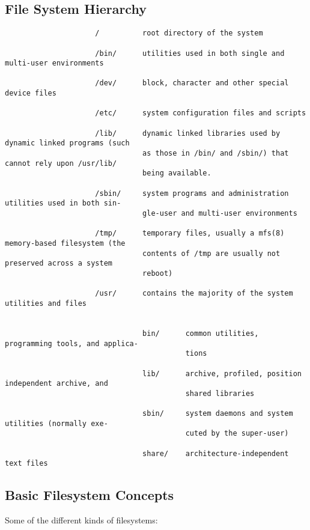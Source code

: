 \documentclass[xga]{xdvislides}
\begin{document}
\subsection{File System Hierarchy}
\small
\begin{verbatim}
                     /          root directory of the system

                     /bin/      utilities used in both single and multi-user environments

                     /dev/      block, character and other special device files

                     /etc/      system configuration files and scripts

                     /lib/      dynamic linked libraries used by dynamic linked programs (such
                                as those in /bin/ and /sbin/) that cannot rely upon /usr/lib/
                                being available.

                     /sbin/     system programs and administration utilities used in both sin-
                                gle-user and multi-user environments

                     /tmp/      temporary files, usually a mfs(8) memory-based filesystem (the
                                contents of /tmp are usually not preserved across a system
                                reboot)

                     /usr/      contains the majority of the system utilities and files


                                bin/      common utilities, programming tools, and applica-
                                          tions

                                lib/      archive, profiled, position independent archive, and
                                          shared libraries

                                sbin/     system daemons and system utilities (normally exe-
                                          cuted by the super-user)

                                share/    architecture-independent text files
\end{verbatim}
\Normalsize

\subsection{Basic Filesystem Concepts}
Some of the different kinds of filesystems:
\end{document}

